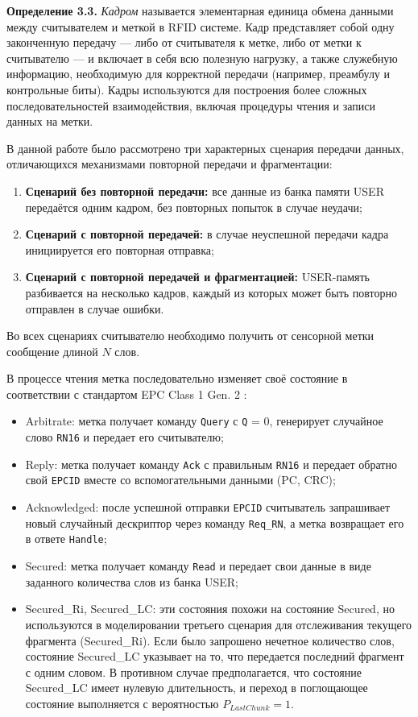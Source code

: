 \documentclass[12pt]{article}
\theoremstyle{definition}
\begin{document}
\textbf{Определение 3.3.} \textit{Кадром} называется элементарная единица обмена данными между считывателем и меткой в RFID системе. Кадр представляет собой одну законченную передачу — либо от считывателя к метке, либо от метки к считывателю — и включает в себя всю полезную нагрузку, а также служебную информацию, необходимую для корректной передачи (например, преамбулу и контрольные биты). Кадры используются для построения более сложных последовательностей взаимодействия, включая процедуры чтения и записи данных на метки.

В данной работе было рассмотрено три характерных сценария передачи данных, отличающихся механизмами повторной передачи и фрагментации:
\begin{enumerate}
  \item \textbf{Сценарий без повторной передачи:} все данные из банка памяти USER передаётся одним кадром, без повторных попыток в случае неудачи;
  \item \textbf{Сценарий с повторной передачей:} в случае неуспешной передачи кадра инициируется его повторная отправка;
  \item \textbf{Сценарий с повторной передачей и фрагментацией:} USER-память разбивается на несколько кадров, каждый из которых может быть повторно отправлен в случае ошибки.
\end{enumerate}

Во всех сценариях считывателю необходимо получить от сенсорной метки сообщение длиной $N$ слов. 

В процессе чтения метка последовательно изменяет своё состояние в соответствии с стандартом EPC Class 1 Gen. 2 \cite{StdGen2}:

\begin{itemize}
    \item Arbitrate: метка получает команду \texttt{Query} с \texttt{Q} = 0, генерирует случайное слово \texttt{RN16} и передает его считывателю;
    \item Reply: метка получает команду \texttt{Ack} с правильным \texttt{RN16} и передает обратно свой \texttt{EPCID} вместе со вспомогательными данными (PC, CRC);
    \item Acknowledged: после успешной отправки \texttt{EPCID} считыватель запрашивает новый случайный дескриптор через команду \texttt{Req\_RN}, а метка возвращает его в ответе \texttt{Handle};
    \item Secured: метка получает команду \texttt{Read} и передает свои данные в виде заданного количества слов из банка USER;
    \item Secured\_{Ri}, Secured\_{LC}: эти состояния похожи на состояние Secured, но используются в моделировании третьего сценария для отслеживания текущего фрагмента (Secured\_{Ri}). Если было запрошено нечетное количество слов, состояние Secured\_{LC} указывает на то, что передается последний фрагмент с одним словом. В противном случае предполагается, что состояние Secured\_{LC} имеет нулевую длительность, и переход в поглощающее состояние выполняется с вероятностью $P_{LastChunk}=1$.
\end{itemize}
\end{document}
